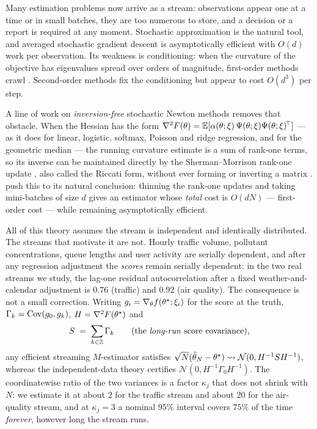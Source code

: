 Many estimation problems now arrive as a stream: observations appear one at a time or in small
batches, they are too numerous to store, and a decision or a report is required at any moment.
Stochastic approximation \citep{robbins1951stochastic} is the natural tool, and averaged stochastic
gradient descent \citep{polyak1992acceleration} is asymptotically efficient with $O(d)$ work per
observation. Its weakness is conditioning: when the curvature of the objective has eigenvalues spread
over orders of magnitude, first-order methods crawl \citep{bottou2018optimization}. Second-order
methods fix the conditioning but appear to cost $O(d^3)$ per step.

A line of work on \emph{inversion-free} stochastic Newton methods removes that obstacle. When the
Hessian has the form
$\nabla^2F(\theta)=\mathbb{E}[\alpha(\theta;\xi)\,\Psi(\theta;\xi)\Psi(\theta;\xi)^{\!\top}]$ --- as it does
for linear, logistic, softmax, Poisson and ridge regression, and for the geometric median --- the
running curvature estimate is a sum of rank-one terms, so its inverse can be maintained directly by
the Sherman--Morrison rank-one update \citep{sherman1950adjustment}, also called the Riccati form,
without ever forming or inverting a matrix \citep{bercu2020efficient,godichonbaggioni2024online}.
\citet{godichonbaggioni2025adaptive} push this to its natural conclusion: thinning the rank-one
updates and taking mini-batches of size $d$ gives an estimator whose \emph{total} cost is $O(dN)$ ---
first-order cost --- while remaining asymptotically efficient.

All of this theory assumes the stream is independent and identically distributed. The streams that
motivate it are not. Hourly traffic volume, pollutant concentrations, queue lengths and user activity
are serially dependent, and after any regression adjustment the \emph{scores} remain serially
dependent: in the two real streams we study, the lag-one residual autocorrelation after a fixed
weather-and-calendar adjustment is $0.76$ (traffic) and $0.92$ (air quality). The consequence is not a
small correction. Writing $g_i=\nabla_\theta f(\theta^\star;\xi_i)$ for the score at the truth,
$\Gamma_k=\operatorname{Cov}(g_0,g_k)$, $H=\nabla^2F(\theta^\star)$ and
\begin{equation}
S \;=\; \sum_{k\in\mathbb{Z}}\Gamma_k
\qquad\text{(the \emph{long-run} score covariance),}
\label{eq:S}
\end{equation}
any efficient streaming $M$-estimator satisfies
$\sqrt{N}(\hat\theta_N-\theta^\star)\rightsquigarrow \mathcal{N}(0,H^{-1}SH^{-1})$, whereas the
independent-data theory certifies $\mathcal{N}(0,H^{-1}\Gamma_0H^{-1})$. The coordinatewise ratio of
the two variances is a factor $\kappa_j$ that does not shrink with $N$: we estimate it at about $2$
for the traffic stream and about $20$ for the air-quality stream, and at $\kappa_j=3$ a nominal $95\%$
interval covers $75\%$ of the time \emph{forever}, however long the stream runs.

